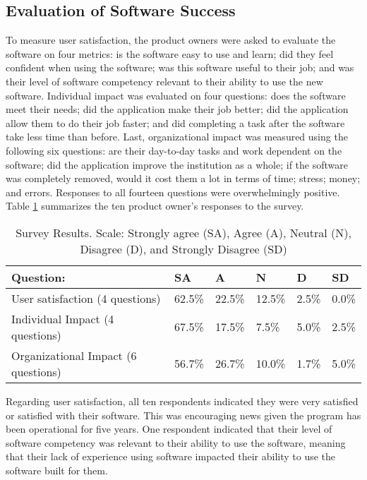 \subsection{Evaluation of Software Success}
 To measure user satisfaction, the product owners were asked to evaluate the software on four metrics: is the software easy to use and learn; did they feel confident when using the software; was this software useful to their job; and was their level of software competency relevant to their ability to use the new software. Individual impact was evaluated on four questions: does the software meet their needs; did the application make their job better; did the application allow them to do their job faster; and did completing a task after the software take less time than before. Last, organizational impact was measured using the following six questions: are their day-to-day tasks and work dependent on the software; did the application improve the institution as a whole; if the software was completely removed, would it cost them a lot in terms of time;  stress;  money; and errors. Responses to all fourteen questions were overwhelmingly positive. Table \ref{tab:surveyResults} summarizes the ten product owner's responses to the survey. 

\begin{table}
\caption{Survey Results. Scale: Strongly agree (SA), Agree (A), Neutral (N), Disagree (D), and Strongly Disagree (SD)}
\label{tab:surveyResults}
\begin{tabular}{p{3.0cm}p{.6cm}p{.6cm}p{.6cm}p{.6cm}p{.6cm}}
Question: & SA & A & N & D & SD \\
 \hline
User satisfaction \newline(4 questions) & 62.5\% & 22.5\% & 12.5\% & 2.5\% & 0.0\% \\
Individual Impact \newline(4 questions) & 67.5\% & 17.5\% & 7.5\% & 5.0\% & 2.5\% \\
Organizational Impact \newline(6 questions) & 56.7\% & 26.7\% & 10.0\% & 1.7\% & 5.0\% \\
\end{tabular}
\end{table}

Regarding user satisfaction, all ten respondents indicated they were very satisfied or satisfied with their software. This was encouraging news given the program has been operational for five years. One respondent indicated that their level of software competency was relevant to their ability to use the software, meaning that their lack of experience using software impacted their ability to use the software built for them. 


